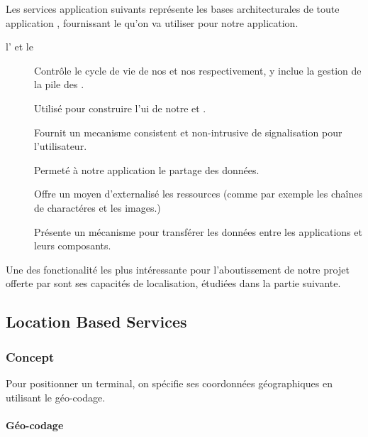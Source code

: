 Les services application suivants représente les bases architecturales de toute application \android{}, fournissant le  qu'on va utiliser pour notre application.

\begin{description}

\item [l' et le ]
Contrôle le cycle de vie de nos  et nos  respectivement, y inclue la gestion de la pile des .

\item[]
Utilisé pour construire l'\gls{ui} de notre  et .

\item[]
Fournit un mecanisme consistent et non-intrusive de signalisation pour l'utilisateur.

\item[]
Permeté à notre application le partage des données.

\item[]
Offre un moyen d'externalisé les ressources (comme par exemple les chaînes de charactéres et les images.)

\item[]
Présente un mécanisme pour transférer les données entre les applications et leurs composants.

\end{description}

Une des fonctionalité les plus intéressante pour l'aboutissement de notre projet offerte par \android{} sont ses capacités de localisation, étudiées dans la partie suivante.

\subsection{Location Based Services}

\subsubsection{Concept}

Pour positionner un terminal, on spécifie ses coordonnées géographiques
en utilisant le géo-codage.

\paragraph[Géo-codage]{Géo-codage\cite{wiki:geocoding}}

